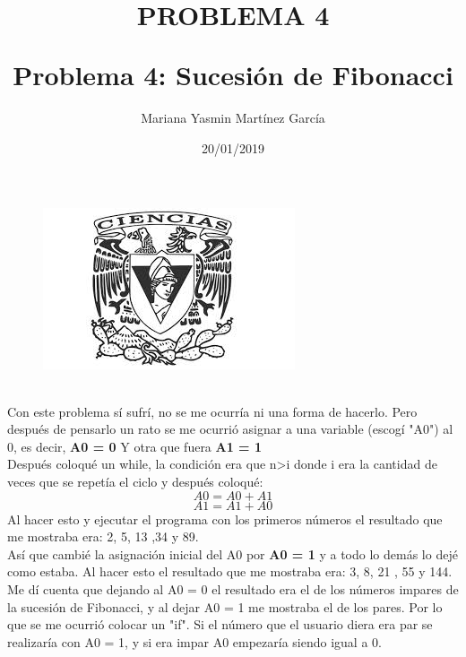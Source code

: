 \documentclass{article}
\title{\Huge\item\color{orange}\textbf{PROBLEMA 4 }}
\author{\Large Mariana Yasmin Martínez García}
\date{\Large 20/01/2019}
\begin{document}
\begin{figure}[t]
	\centering
	\includegraphics[width=0.7\linewidth]{../Imagenes/1}
	\caption{}
	\label{figura:1}
\end{figure}


	\maketitle
		
	\newpage
	
	\title{\huge\textbf{Problema 4: Sucesión de Fibonacci }} \\
	Con este problema sí sufrí, no se me ocurría ni una forma de hacerlo. Pero después de pensarlo un rato se me ocurrió asignar a una variable (escogí "A0") al 0, es decir, \textbf{A0 = 0} Y otra que fuera \textbf{A1 = 1}\\
	Después coloqué un while, la condición era que n>i donde i era la cantidad de veces que se repetía el ciclo y después coloqué:
	\[ A0 = A0 + A1 \]
	\[ A1 = A1 + A0 \]
	Al hacer esto y ejecutar el programa con los primeros números el resultado que me mostraba era: 2, 5, 13 ,34 y 89. \\
	Así que cambié la asignación inicial del A0 por \textbf{A0 = 1} y a todo lo demás lo dejé como estaba. Al hacer esto el resultado que me mostraba era: 3, 8, 21 , 55 y 144. \\
	Me dí cuenta que dejando al A0 = 0 el resultado era el de los números impares de la sucesión de Fibonacci, y al dejar A0 = 1 me mostraba el de los pares. Por lo que se me ocurrió colocar un "if". Si el número que el usuario diera era par se realizaría con A0 = 1, y si era impar A0 empezaría siendo igual a 0. 
\end{document}
